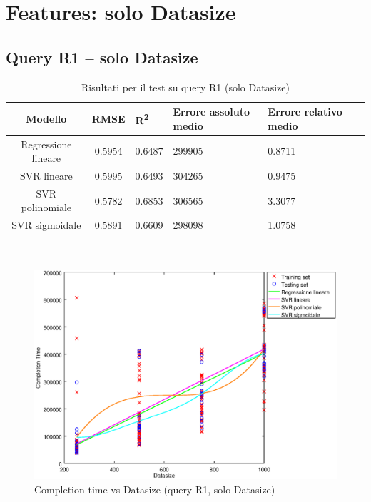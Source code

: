 \documentclass[a4paper,11pt]{article}
\begin{document}
\newpage
\section{Features: solo Datasize}
\subsection{Query R1 -- solo Datasize}

\begin{table}[bhpt]
	\centering
	\begin{adjustbox}{center}
		\begin{tabular}{c | c M{1cm} M{2.5cm} M{2.5cm} M{1.8cm}}
			Modello & RMSE & R\textsuperscript{2} & Errore assoluto medio & Errore relativo medio \tabularnewline
			\hline
			Regressione lineare & 0.5954 & 0.6487 & 299905 & 0.8711 \\
			SVR lineare & 0.5995 & 0.6493 & 304265 & 0.9475 \\
			SVR polinomiale & 0.5782 & 0.6853 & 306565 & 3.3077 \\
			SVR sigmoidale & 0.5891 & 0.6609 & 298098 & 1.0758 \\
		\end{tabular}
	\end{adjustbox}
	\\
	\caption{Risultati per il test su query R1 (solo Datasize)}
	\label{table_R1_datasize}
\end{table}

\begin {figure}[hbtp]
\centering
\includegraphics[width=\textwidth]{output/R1_SOLO_DATASIZE/plot_R1.eps}
\caption {Completion time vs Datasize (query R1, solo Datasize)}
\end {figure}
\end{document}
